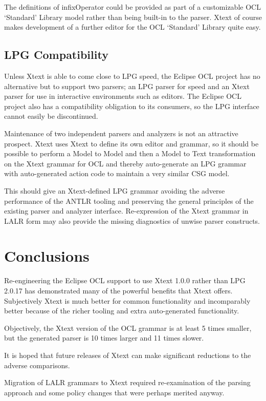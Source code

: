 \documentclass{eceasst}
\begin{document}
The definitions of infixOperator could be provided as part of a customizable OCL `Standard' Library model rather than being built-in to the parser. Xtext of course makes development of a further editor for the OCL `Standard' Library quite easy.

\subsection{LPG Compatibility}

Unless Xtext is able to come close to LPG speed, the Eclipse OCL project has no alternative but to support two parsers; an LPG parser for speed and an Xtext parser for use in interactive environments such as editors. The Eclipse OCL project also has a compatibility obligation to its consumers, so the LPG interface cannot easily be discontinued.

Maintenance of two independent parsers and analyzers is not an attractive prospect. Xtext uses Xtext to define its own editor and grammar, so it should be possible to perform a Model to Model and then a Model to Text transformation on the Xtext grammar for OCL and thereby auto-generate an LPG grammar with auto-generated action code to maintain a very similar CSG model.

This should give an Xtext-defined LPG grammar avoiding the adverse performance of the ANTLR tooling and preserving the general principles of the existing parser and analyzer interface. Re-expression of the Xtext grammar in LALR form may also provide the missing diagnostics of unwise parser constructs.

\section{Conclusions}

Re-engineering the Eclipse OCL support to use Xtext 1.0.0 rather than LPG 2.0.17 has demonstrated many of the powerful benefits that Xtext offers. Subjectively Xtext is much better for common functionality and incomparably better because of the  richer tooling and extra auto-generated functionality.

Objectively, the Xtext version of the OCL grammar is at least 5 times smaller, but the generated parser is 10 times larger and 11 times slower.

It is hoped that future releases of Xtext can make significant reductions to the adverse comparisons.

Migration of LALR grammars to Xtext required re-examination of the parsing approach and some policy changes that were perhaps merited anyway.
\end{document}
